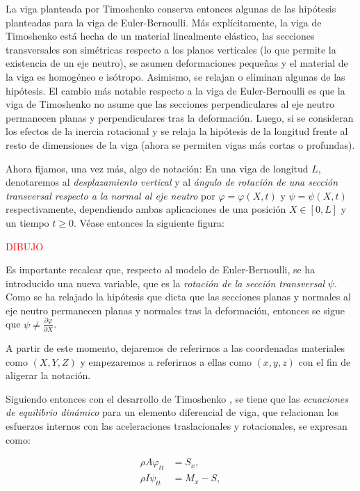 La viga planteada por Timoshenko conserva entonces algunas de las hipótesis planteadas para la viga de Euler-Bernoulli. Más explícitamente, la viga de Timoshenko está hecha de un material linealmente elástico, las secciones transversales son simétricas respecto a los planos verticales (lo que permite la existencia de un eje neutro), se asumen deformaciones pequeñas y el material de la viga es homogéneo e isótropo. Asimismo, se relajan o eliminan algunas de las hipótesis. El cambio más notable respecto a la viga de Euler-Bernoulli es que la viga de Timoshenko no asume que las secciones perpendiculares al eje neutro permanecen planas y perpendiculares tras la deformación. Luego, si se consideran los efectos de la inercia rotacional y se relaja la hipótesis de la longitud frente al resto de dimensiones de la viga (ahora se permiten vigas más cortas o profundas).

Ahora fijamos, una vez más, algo de notación: En una viga de longitud $L$, denotaremos al \textit{desplazamiento vertical} y al \textit{ángulo de rotación de una sección transversal respecto a la normal al eje neutro} por $\varphi = \varphi(X,t)$ y $\psi = \psi(X,t)$ respectivamente, dependiendo ambas aplicaciones de una posición $X \in [0, L]$ y un tiempo $t \geq 0$. Véase entonces la siguiente figura:

\textcolor{red}{DIBUJO}

Es importante recalcar que, respecto al modelo de Euler-Bernoulli, se ha introducido una nueva variable, que es la \textit{rotación de la sección transversal} $\psi$. Como se ha relajado la hipótesis que dicta que las secciones planas y normales al eje neutro permanecen planas y normales tras la deformación, entonces se sigue que $\psi \neq \frac{\partial \varphi}{\partial X}$. 

A partir de este momento, dejaremos de referirnos a las coordenadas materiales como $(X,Y,Z)$ y empezaremos a referirnos a ellas como $(x,y,z)$ con el fin de aligerar la notación. 

Siguiendo entonces con el desarrollo de Timoshenko \cite{timoshenko-1921-lxv-ion-cor,timoshenko-1922-x-ion-tra}, se tiene que las \textit{ecuaciones de equilibrio dinámico} para un elemento diferencial de viga, que relacionan los esfuerzos internos con las aceleraciones traslacionales y rotacionales, se expresan como:

\begin{align}
    \rho A \varphi_{tt} &= S_x, \label{timoshenkoBasico:equilDinamicoCortante}\\
    \rho I \psi_{tt} &= M_x - S, \label{timoshenkoBasico:equilDinamicoFlector}
\end{align}

